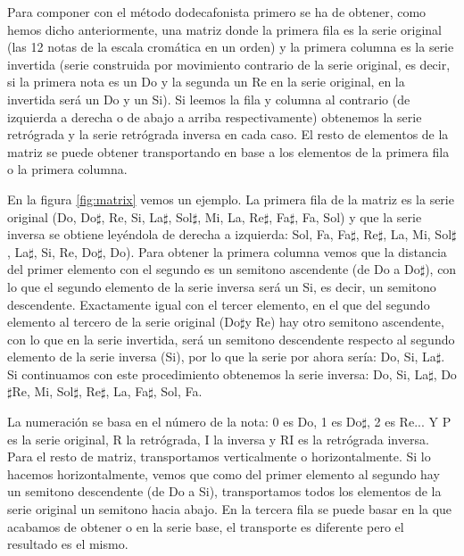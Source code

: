 \documentclass[a4paper,openany,12pt]{memoir}
\newcommand{\textsharp}{$\sharp$}
\begin{document}
Para componer con el método dodecafonista primero se ha de obtener, como hemos dicho anteriormente, una matriz donde la primera fila es la serie original (las 12 notas de la escala cromática en un orden) y la primera columna es la serie invertida (serie construida por movimiento contrario de la serie original, es decir, si la primera nota es un Do y la segunda un Re en la serie original, en la invertida será un Do y un Si). Si leemos la fila y columna al contrario (de izquierda a derecha o de abajo a arriba respectivamente) obtenemos la serie retrógrada y la serie retrógrada inversa en cada caso. El resto de elementos de la matriz se puede obtener transportando en base a los elementos de la primera fila o la primera columna.

En la figura \ref{fig:matrix} vemos un ejemplo. La primera fila de la matriz es la serie original (Do, Do\textsharp, Re, Si, La\textsharp, Sol\textsharp, Mi, La, Re\textsharp, Fa\textsharp, Fa, Sol) y que la serie inversa se obtiene leyéndola de derecha a izquierda: Sol, Fa, Fa\textsharp, Re\textsharp, La, Mi, Sol\textsharp, La\textsharp, Si, Re, Do\textsharp, Do). Para obtener la primera columna vemos que la distancia del primer elemento con el segundo es un semitono ascendente (de Do a Do\textsharp), con lo que el segundo elemento de la serie inversa será un Si, es decir, un semitono descendente. Exactamente igual con el tercer elemento, en el que del segundo elemento al tercero de la serie original (Do\textsharp y Re) hay otro semitono ascendente, con lo que en la serie invertida, será un semitono descendente respecto al segundo elemento de la serie inversa (Si), por lo que la serie por ahora sería: Do, Si, La\textsharp. Si continuamos con este procedimiento obtenemos la serie inversa: Do, Si, La\textsharp, Do\textsharp Re, Mi, Sol\textsharp, Re\textsharp, La, Fa\textsharp, Sol, Fa. 

La numeración se basa en el número de la nota: 0 es Do, 1 es Do\textsharp, 2 es Re... Y P es la serie original, R la retrógrada, I la inversa y RI es la retrógrada inversa. Para el resto de matriz, transportamos verticalmente o horizontalmente. Si lo hacemos horizontalmente, vemos que como del primer elemento al segundo hay un semitono descendente (de Do a Si), transportamos todos los elementos de la serie original un semitono hacia abajo. En la tercera fila se puede basar en la que acabamos de obtener o en la serie base, el transporte es diferente pero el resultado es el mismo.
\end{document}
